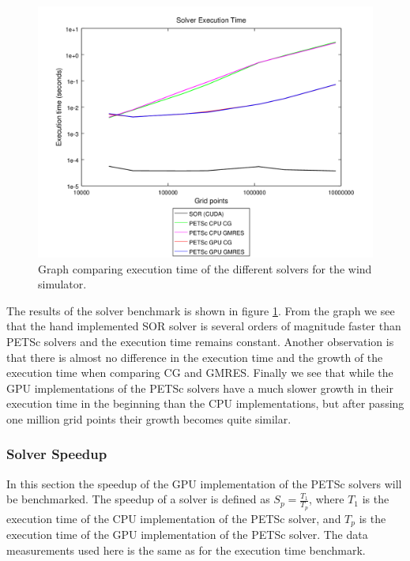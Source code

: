 \begin{figure}[ht]
	\center
	\includegraphics[width=1.0\textwidth]{results/data/sb/exec_time_all}
	\caption{Graph comparing execution time of the different solvers for the
		wind simulator.}
	\label{fig:sb_exec_time_all}
\end{figure}

The results of the solver benchmark is shown in figure \ref{fig:sb_exec_time_all}.
From the graph we see that the hand implemented SOR solver is several orders of
magnitude faster than PETSc solvers and the execution time remains constant.
Another observation is that there is almost no difference in the execution time
and the growth of the execution time when comparing CG and GMRES. Finally we see
that while the GPU implementations of the PETSc solvers have a much slower growth
in their execution time in the beginning than the CPU implementations, but after
passing one million grid points their growth becomes quite similar.

\subsubsection{Solver Speedup}

In this section the speedup of the GPU implementation of the PETSc solvers will
be benchmarked. The speedup of a solver is defined as $S_p = \frac{T_1}{T_p}$,
where $T_1$ is the execution time of the CPU implementation of the PETSc solver,
and $T_p$ is the execution time of the GPU implementation of the PETSc solver.
The data measurements used here is the same as for the execution time benchmark.

